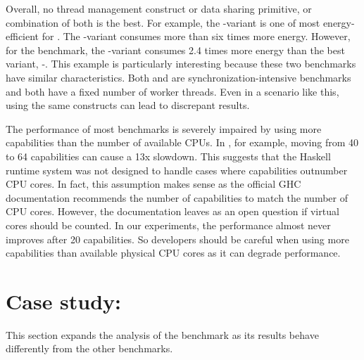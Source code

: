  Overall, no thread management construct or data sharing primitive, or combination of both is the best. For example, the \forkIO-\TMVar variant is one of most energy-efficient for \dining. The \forkOS-\TMVar variant consumes more than six times more energy. However, for the \chameneos benchmark, the \forkIO-\TMVar variant consumes 2.4 times more energy than the best variant, \forkIO-\MVar. This example is particularly interesting because these two benchmarks have similar characteristics. Both \dining and \chameneos are synchronization-intensive benchmarks and both have a fixed number of worker threads. Even in a scenario like this, using the same constructs can lead to discrepant results.
\newline

 The performance of most benchmarks is severely impaired by using more capabilities than the number of available CPUs. In \chameneos, for example, moving from 40 to 64 capabilities can cause a 13x slowdown. This suggests that the Haskell runtime system was not designed to handle cases where capabilities outnumber CPU cores. In fact, this assumption makes sense as the official GHC documentation recommends the number of capabilities to match the number of CPU cores. However, the documentation leaves as an open question if virtual cores should be counted. In our experiments, the performance almost never improves after 20 capabilities. So developers should be careful when using more capabilities than available physical CPU cores as it can degrade performance.


\section{Case study: \fasta}\label{sec:fasta}
This section expands the analysis of the \fasta benchmark as its results behave differently from the other benchmarks.

